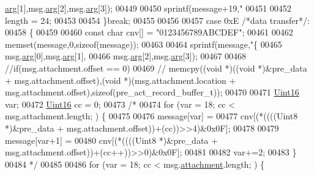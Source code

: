 \begin{DoxyCode}
{{{      \hyperlink{a00031_af7d6f762438c80072bd9dc0e4dd4ae1e}{arg}[1],msg.\hyperlink{a00031_af7d6f762438c80072bd9dc0e4dd4ae1e}{arg}[2],msg.\hyperlink{a00031_af7d6f762438c80072bd9dc0e4dd4ae1e}{arg}[3]);
00449 
00450        sprintf(message+19,\textcolor{stringliteral}{"%
00451 
00452        length = 24;
00453 
00454        \}\textcolor{keywordflow}{break};
00455 
00456 
00457        \textcolor{keywordflow}{case} 0xE \textcolor{comment}{/*data transfer*/}:
00458        \{
00459 
00460        \textcolor{keyword}{const} \textcolor{keywordtype}{char} cnv[] = \textcolor{stringliteral}{"0123456789ABCDEF"};
00461 
00462        memset(message,0,\textcolor{keyword}{sizeof}(message));
00463 
00464        sprintf(message,\textcolor{stringliteral}{"\{%
00465                                             msg.\hyperlink{a00031_af7d6f762438c80072bd9dc0e4dd4ae1e}{arg}[0],msg.\hyperlink{a00031_af7d6f762438c80072bd9dc0e4dd4ae1e}{arg}[1],
00466                                             msg.\hyperlink{a00031_af7d6f762438c80072bd9dc0e4dd4ae1e}{arg}[2],msg.\hyperlink{a00031_af7d6f762438c80072bd9dc0e4dd4ae1e}{arg}[3]);
00467 
00468        \textcolor{comment}{//if(msg.attachment.offset == 0)}
00469        \textcolor{comment}{//  memcpy((void *)((void *)&pre\_data + msg.attachment.offset),(void *)(msg.attachment.location +
       msg.attachment.offset),sizeof(pre\_act\_record\_buffer\_t));}
00470 
00471        \hyperlink{a00072_a59a9f6be4562c327cbfb4f7e8e18f08b}{Uint16} var;
00472        \hyperlink{a00072_a59a9f6be4562c327cbfb4f7e8e18f08b}{Uint16} cc = 0;
00473 \textcolor{comment}{/*}
00474 \textcolor{comment}{       for (var = 18; cc < msg.attachment.length; ) \{}
00475 \textcolor{comment}{}
00476 \textcolor{comment}{                   message[var]   =}
00477 \textcolor{comment}{                    cnv[(*((((Uint8 *)&pre\_data + msg.attachment.offset))+(cc))>>4)&0x0F];}
00478 \textcolor{comment}{}
00479 \textcolor{comment}{                   message[var+1]   =}
00480 \textcolor{comment}{                    cnv[(*((((Uint8 *)&pre\_data + msg.attachment.offset))+(cc++))>>0)&0x0F];}
00481 \textcolor{comment}{}
00482 \textcolor{comment}{                   var+=2;}
00483 \textcolor{comment}{       \}}
00484 \textcolor{comment}{*/}
00485    
00486        \textcolor{keywordflow}{for} (var = 18; cc < msg.\hyperlink{a00031_a040f6d5d58d18d8aeaf447eda7f50172}{attachment}.length; ) \{
}}}}}
\end{DoxyCode}
